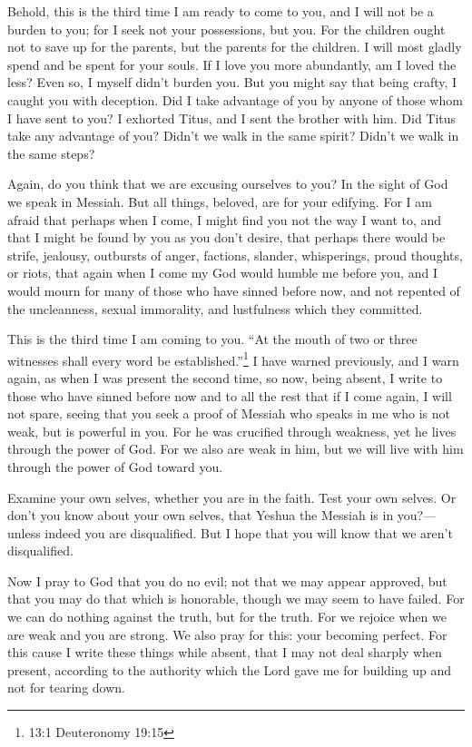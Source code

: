 \myverse{}Behold, this is the third time I am ready to come to you, and
I will not be a burden to you; for I seek not your possessions, but you. For the children ought not to
save up for the parents, but the parents for the children.
\myverse{}I will most gladly spend and be spent for your souls. If I love you more
abundantly, am I loved the less?
\myverse{}Even so, I myself didn’t burden you. But you might say that being crafty,
I caught you with deception.
\myverse{}Did I take advantage of you by anyone of those whom I have sent to you?
\myverse{}I exhorted Titus, and I sent the brother with him. Did Titus take any advantage
of you? Didn’t we walk in the same spirit? Didn’t we walk in the same steps?

\myverse{}Again, do you think that we are excusing ourselves to you? In
the sight of God we speak in Messiah. But all things, beloved, are for your edifying.
\myverse{}For I am afraid that perhaps when I come, I might find you not the way I
want to, and that I might be found by you as you don’t desire, that perhaps there would be strife, jealousy,
outbursts of anger, factions, slander, whisperings, proud thoughts, or riots,
\myverse{}that again when I come my God would humble me before you, and I would mourn
for many of those who have sinned before now, and not repented of the uncleanness, sexual immorality,
and lustfulness which they committed.


\mychapter{} \myverse*{}This is the third time I am coming to you. “At the mouth of two
or three witnesses shall every word be established.”\footnote{13:1 Deuteronomy 19:15}
\myverse{}I have warned previously, and I warn again, as when I was present the second
time, so now, being absent, I write to those who have sinned before now and to all the rest that if I
come again, I will not spare,
\myverse{}seeing that you seek a proof of Messiah who speaks in me who is not weak, but
is powerful in you.
\myverse{}For he was crucified through weakness, yet he lives through the power of God.
For we also are weak in him, but we will live with him through the power of God toward you.

\myverse{}Examine your own selves, whether you are in the faith. Test your
own selves. Or don’t you know about your own selves, that Yeshua the Messiah is in you?—unless indeed
you are disqualified.
\myverse{}But I hope that you will know that we aren’t disqualified.

\myverse{}Now I pray to God that you do no evil; not that we may appear
approved, but that you may do that which is honorable, though we may seem to have failed.
\myverse{}For we can do nothing against the truth, but for the truth.
\myverse{}For we rejoice when we are weak and you are strong. We also pray for this:
your becoming perfect.
\myverse{}For this cause I write these things while absent, that I may not deal sharply
when present, according to the authority which the Lord gave me for building up and not for tearing down.

